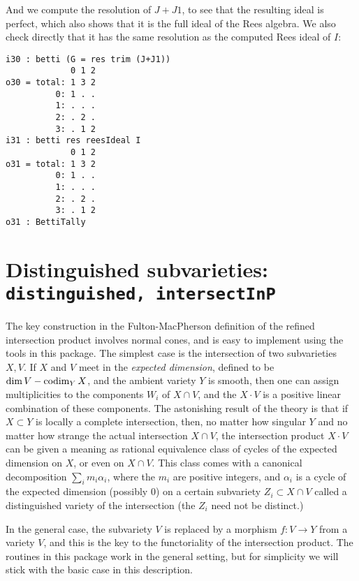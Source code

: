 \documentclass[twoside,12pt, leqno]{amsart}
\begin{document}
And we compute the resolution of $J+J1$, to see that the resulting ideal is perfect, which also shows that
it is the full ideal of the Rees algebra. We also check directly that it has the same resolution as the computed
Rees ideal of $I$:
\begin{footnotesize}
 \begin{verbatim}
i30 : betti (G = res trim (J+J1))
             0 1 2
o30 = total: 1 3 2
          0: 1 . .
          1: . . .
          2: . 2 .
          3: . 1 2
i31 : betti res reesIdeal I
             0 1 2
o31 = total: 1 3 2
          0: 1 . .
          1: . . .
          2: . 2 .
          3: . 1 2
o31 : BettiTally
  \end{verbatim}
  \end{footnotesize}

     

\section{Distinguished subvarieties: {\tt distinguished, intersectInP}}

The key construction in the Fulton-MacPherson definition of the refined intersection  product 
\cite[Section 6.1]{F}
involves normal cones, and is easy to implement using the tools in this package. The simplest case is the intersection of two subvarieties $X,V$. If $X$ and $V$ meet in the \emph{expected dimension}, defined to be $\dim V - \operatorname{codim}_{Y} X$,
and the ambient variety $Y$ is smooth, then one can assign multiplicities to the components $W_{i}$ of $X\cap V$, and the $X\cdot V$ is a positive linear
combination of these components. The astonishing result of the theory is that if $X\subset Y$ is locally a complete intersection, then, no matter how singular $Y$ and no matter how strange the actual intersection $X\cap V$, the intersection product 
$X\cdot V$ can be given a meaning as rational equivalence class of cycles of the expected dimension on $X$, or even on $X\cap V$. This class comes with a canonical decomposition $\sum_{i}m_{i}\alpha_{i}$, 
where the $m_{i}$ are positive integers, and $\alpha_{i}$ is a cycle of the expected dimension (possibly 0)
on a certain subvariety $Z_{i}\subset X\cap V$ called a distinguished variety of the intersection (the $Z_{i}$ need not be distinct.)

In the general case, the subvariety $V$ is replaced by a morphism $f:V\to Y$ from a variety $V$, and this is the key to the functoriality of the intersection product. The routines in this package work in the general setting, but for simplicity we will stick with the basic case in this description.
\end{document}
